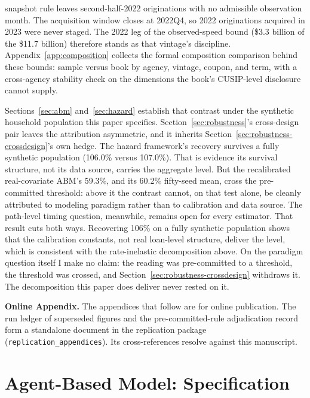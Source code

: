 \documentclass[12pt]{article}
\begin{document}
snapshot rule leaves second-half-2022 originations with no admissible observation month. The acquisition window closes at 2022Q4, so 2022 originations acquired in 2023 were never staged. The 2022 leg of the observed-speed bound (\$3.3 billion of the \$11.7 billion) therefore stands as that vintage's discipline. Appendix~\ref{app:composition} collects the formal composition comparison behind these bounds: sample versus book by agency, vintage, coupon, and term, with a cross-agency stability check on the dimensions the book's CUSIP-level disclosure cannot supply.

Sections~\ref{sec:abm} and~\ref{sec:hazard} establish that contrast under the synthetic household population this paper specifies. Section~\ref{sec:robustness}'s cross-design pair leaves the attribution asymmetric, and it inherits Section~\ref{sec:robustness-crossdesign}'s own hedge. The hazard framework's recovery survives a fully synthetic population (106.0\% versus 107.0\%). That is evidence its survival structure, not its data source, carries the aggregate level. But the recalibrated real-covariate ABM's 59.3\%, and its 60.2\% fifty-seed mean, cross the pre-committed threshold: above it the contrast cannot, on that test alone, be cleanly attributed to modeling paradigm rather than to calibration and data source. The path-level timing question, meanwhile, remains open for every estimator. That result cuts both ways. Recovering 106\% on a fully synthetic population shows that the calibration constants, not real loan-level structure, deliver the level, which is consistent with the rate-inelastic decomposition above. On the paradigm question itself I make no claim: the reading was pre-committed to a threshold, the threshold was crossed, and Section~\ref{sec:robustness-crossdesign} withdraws it. The decomposition this paper does deliver never rested on it.

\clearpage



\clearpage
\appendix

\noindent\textbf{Online Appendix.} The appendices that follow are for online publication. The run ledger of superseded figures and the pre-committed-rule adjudication record form a standalone document in the replication package (\texttt{replication\_appendices}). Its cross-references resolve against this manuscript.

\section{Agent-Based Model: Specification}\label{sec:method-abm}
\end{document}
